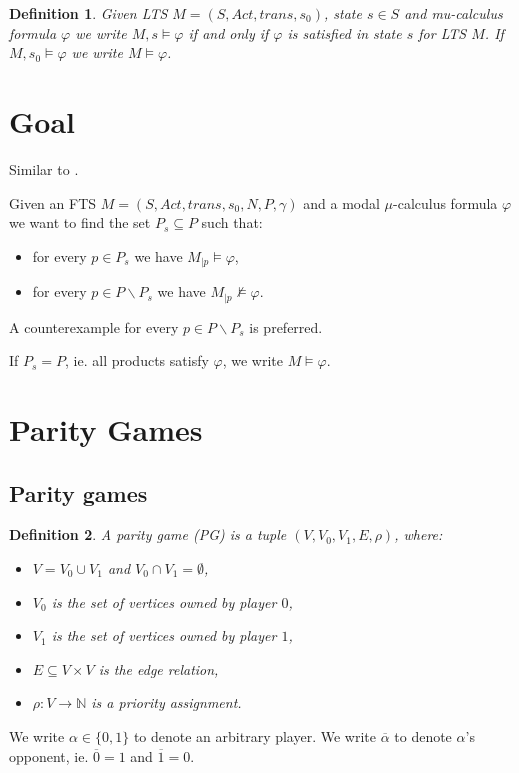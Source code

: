 \documentclass[]{article}
\newtheorem{definition}{Definition}[section]
\begin{document}
\begin{definition}
	\label{def_sat}
	Given LTS $M = (S, Act, trans, s_0)$, state $s \in S$ and mu-calculus formula $\varphi$ we write $M,s \models \varphi$ if and only if $\varphi$ is satisfied in state $s$ for LTS $M$. If $M, s_0 \models \varphi$ we write $M \models \varphi$.
\end{definition}
\section{Goal}
Similar to \cite{inproceedings}.

Given an FTS $M = (S, Act, trans, s_0, N, P, \gamma)$ and a modal $\mu$-calculus formula $\varphi$ we want to find the set $P_s \subseteq P$ such that:
\begin{itemize}
	\item for every $p \in P_s$ we have $M_{|p} \models \varphi$,
	\item for every $p \in P \backslash P_s$ we have $M_{|p} \not\models \varphi$.
\end{itemize}
A counterexample for every $p \in P \backslash P_s$ is preferred.

If $P_s = P$, ie. all products satisfy $\varphi$, we write $M \models \varphi$.

\section{Parity Games}
\subsection{Parity games}
\begin{definition}
	\label{def_PG}\cite{Bradfield2018}
	A parity game (PG) is a tuple $(V, V_0, V_1, E, \rho)$, where:
	\begin{itemize}
		\item $V = V_0 \cup V_1$ and $V_0 \cap V_1 = \emptyset$,
		\item $V_0$ is the set of vertices owned by player $0$,
		\item $V_1$ is the set of vertices owned by player $1$, 
		\item $E \subseteq V \times V$ is the edge relation,
		\item $\rho :  V \rightarrow \mathbb{N}$ is a priority assignment.
	\end{itemize}
\end{definition}
We write $\alpha \in \{0,1\}$ to denote an arbitrary player. We write $\overline{\alpha}$ to denote $\alpha$'s opponent, ie. $\overline{0} = 1$ and $\overline{1} = 0$.
\end{document}

